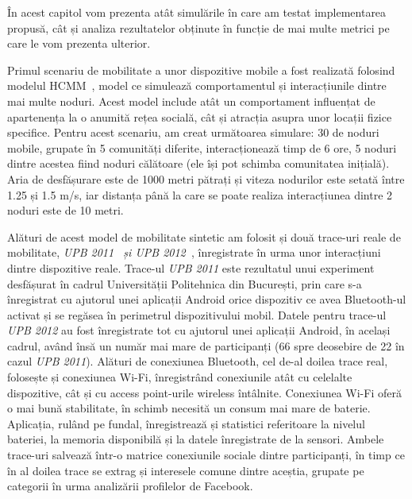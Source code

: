 \documentclass[12pt,a4paper]{report}
\begin{document}
În acest capitol vom prezenta atât simulările în care am testat implementarea propusă, cât și analiza rezultatelor obținute în funcție de mai multe metrici pe care le vom prezenta ulterior.

Primul scenariu de mobilitate a unor dispozitive mobile a fost realizată folosind modelul HCMM~\cite{hcmm}, model ce simulează comportamentul și interacțiunile dintre mai multe noduri. Acest model include atât un comportament influențat de apartenența la o anumită rețea socială, cât și atracția asupra unor locații fizice specifice. Pentru acest scenariu, am creat următoarea simulare: 30 de noduri mobile, grupate în 5 comunități diferite, interacționează timp de 6 ore, 5 noduri dintre acestea fiind noduri călătoare (ele își pot schimba comunitatea inițială). Aria de desfășurare este de 1000 metri pătrați și viteza nodurilor este setată între 1.25 și 1.5 m/s, iar distanța până la care se poate realiza interacțiunea dintre 2 noduri este de 10 metri.

Alături de acest model de mobilitate sintetic am folosit și două trace-uri reale de mobilitate, \textit{UPB 2011~\cite{upb2011} și UPB 2012~\cite{upb2012}}, înregistrate în urma unor interacțiuni dintre dispozitive reale. Trace-ul \textit{UPB 2011} este rezultatul unui experiment desfășurat în cadrul Universității Politehnica din București, prin care s-a înregistrat cu ajutorul unei aplicații Android orice dispozitiv ce avea Bluetooth-ul activat și se regăsea în perimetrul dispozitivului mobil. Datele pentru trace-ul \textit{UPB 2012} au fost înregistrate tot cu ajutorul unei aplicații Android, în același cadrul, având însă un număr mai mare de participanți (66 spre deosebire de 22 în cazul \textit{UPB 2011}). Alături de conexiunea Bluetooth, cel de-al doilea trace real, folosește și conexiunea Wi-Fi, înregistrând conexiunile atât cu celelalte dispozitive, cât și cu access point-urile wireless întâlnite. Conexiunea Wi-Fi oferă o mai bună stabilitate, în schimb necesită un consum mai mare de baterie. Aplicația, rulând pe fundal, înregistrează și statistici referitoare la nivelul bateriei, la memoria disponibilă și la datele înregistrate de la sensori. Ambele trace-uri salvează într-o matrice conexiunile sociale dintre participanți, în timp ce în al doilea trace se extrag și interesele comune dintre aceștia, grupate pe categorii în urma analizării profilelor de Facebook.
\end{document}
